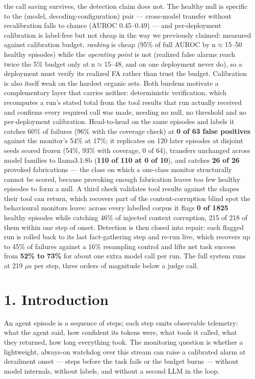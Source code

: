 \documentclass[11pt]{article}
\begin{document}
the call saving survives, the detection claim does not. The healthy null is specific to the (model, decoding-configuration) pair --- cross-model transfer without recalibration falls to chance (AUROC 0.45--0.49) --- and per-deployment calibration is label-free but not cheap in the way we previously claimed: measured against calibration budget, \emph{ranking} is cheap (95\% of full AUROC by n$\approx$15--50 healthy episodes) while the \emph{operating point} is not (realized false alarms reach twice the 5\% budget only at n$\approx$15--48, and on one deployment never do), so a deployment must verify its realized FA rather than trust the budget. Calibration is also itself weak on the hardest organic sets. Both burdens motivate a complementary layer that carries neither: deterministic verification, which recomputes a run's stated total from the tool results that run actually received and confirms every required call was made, needing no null, no threshold and no per-deployment calibration. Head-to-head on the same episodes and labels it catches 60\% of failures (96\% with the coverage check) at \textbf{0 of 63 false positives} against the monitor's 54\% at 17\%; it replicates on 120 later episodes at disjoint seeds scored frozen (54\%, 93\% with coverage, 0 of 64), transfers unchanged across model families to llama3.1:8b (\textbf{110 of 110 at 0 of 10}), and catches \textbf{26 of 26} provoked fabrications --- the class on which a one-class monitor structurally cannot be scored, because provoking enough fabrication leaves too few healthy episodes to form a null. A third check validates tool results against the shapes their tool can return, which recovers part of the content-corruption blind spot the behavioural monitors leave: across every labelled corpus it flags \textbf{0 of 1825} healthy episodes while catching 46\% of injected context corruption, 215 of 218 of them within one step of onset. Detection is then closed into repair: each flagged run is rolled back to its last fact-gathering step and re-run live, which recovers up to 45\% of failures against a 16\% resampling control and lifts net task success from \textbf{52\% to 73\%} for about one extra model call per run. The full system runs at 219 $\mu$s per step, three orders of magnitude below a judge call.


\section{1. Introduction}


An agent episode is a sequence of steps; each step emits observable telemetry: what the agent said, how confident its tokens were, what tools it called, what they returned, how long everything took. The monitoring question is whether a lightweight, always-on watchdog over this stream can raise a calibrated alarm at derailment onset --- steps before the task fails or the budget burns --- without model internals, without labels, and without a second LLM in the loop.
\end{document}
